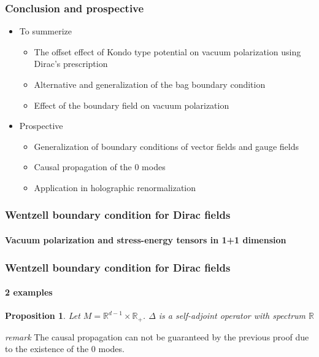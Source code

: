 \documentclass[french]{beamer}
\newtheorem{proposition}{Proposition}
\begin{document}
\begin{frame}
\frametitle{Conclusion and prospective}



\begin{itemize}

\item To summerize
 \begin{itemize}
 \item The offset effect of Kondo type potential on vacuum polarization using Dirac's prescription
 \item Alternative and generalization of the bag boundary condition
 \item Effect of the boundary field on vacuum polarization 
 \end{itemize}

\item Prospective
 \begin{itemize}
 \item Generalization of boundary conditions of vector fields and gauge fields
 \item Causal propagation of the 0 modes
 \item Application in holographic renormalization
 \end{itemize}

\end{itemize}


\end{frame}
\begin{frame}
\frametitle{Wentzell boundary condition for Dirac fields}
\framesubtitle{Vacuum polarization and stress-energy tensors in 1+1 dimension}



\end{frame}
\begin{frame}
\frametitle{Wentzell boundary condition for Dirac fields}
\framesubtitle{2 examples}

\begin{proposition}
Let $M = \mathbb{R}^{d-1} \times \mathbb{R}_+$. $\Delta$ is a self-adjoint operator with spectrum $\mathbb{R}$
\end{proposition}

\textit{remark}
The causal propagation can not be guaranteed by the previous proof due to the existence of the 0 modes.


\end{frame}
\end{document}

